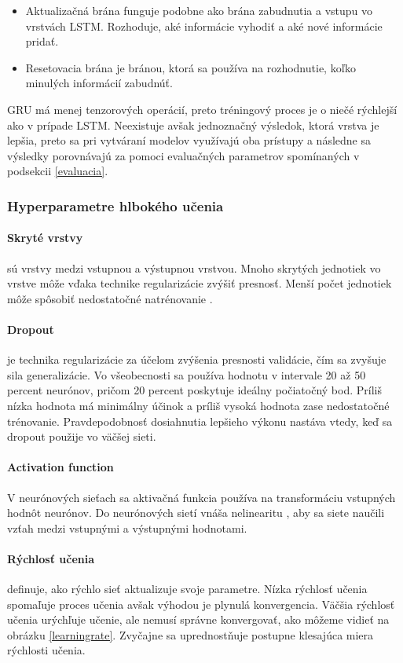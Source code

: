 \begin{itemize}
    \item Aktualizačná brána funguje podobne ako brána zabudnutia a vstupu vo vrstvách LSTM. Rozhoduje, aké informácie vyhodiť a aké nové informácie pridať.
    \item Resetovacia brána je bránou, ktorá sa používa na rozhodnutie, koľko minulých informácií zabudnúť.
\end{itemize}

GRU má menej tenzorových operácií, preto tréningový proces je o niečé rýchlejší ako v prípade LSTM. Neexistuje avšak jednoznačný výsledok, ktorá vrstva je lepšia, preto sa pri vytváraní modelov využívajú oba prístupy a následne sa výsledky porovnávajú za pomoci evaluačných parametrov spomínaných v podsekcii \ref{evaluacia}. 

\subsubsection{Hyperparametre hlbokého učenia}
\paragraph{Skryté vrstvy} sú vrstvy medzi vstupnou a výstupnou vrstvou. Mnoho skrytých jednotiek vo vrstve môže vďaka technike regularizácie zvýšiť presnosť. Menší počet jednotiek môže spôsobiť nedostatočné natrénovanie \cite{hyperparams}.

\paragraph{Dropout} je technika regularizácie za účelom zvýšenia presnosti validácie, čím sa zvyšuje sila generalizácie. Vo všeobecnosti sa používa hodnotu v intervale 20 až 50 percent neurónov, pričom 20 percent poskytuje ideálny počiatočný bod. Príliš nízka hodnota má minimálny účinok a príliš vysoká hodnota zase nedostatočné trénovanie. Pravdepodobnosť dosiahnutia lepšieho výkonu nastáva vtedy, keď sa dropout použije vo väčšej sieti.

\paragraph{Activation function}
V neurónových sieťach sa aktivačná funkcia používa na transformáciu vstupných hodnôt neurónov. Do neurónových sietí vnáša nelinearitu , aby sa siete naučili vzťah medzi vstupnými a výstupnými hodnotami.

\paragraph{Rýchlosť učenia} definuje, ako rýchlo sieť aktualizuje svoje parametre. Nízka rýchlosť učenia spomaľuje proces učenia avšak výhodou je plynulá konvergencia. Väčšia rýchlosť učenia urýchľuje učenie, ale nemusí správne konvergovať, ako môžeme vidieť na obrázku \ref{learningrate}. Zvyčajne sa uprednostňuje postupne klesajúca miera rýchlosti učenia.

